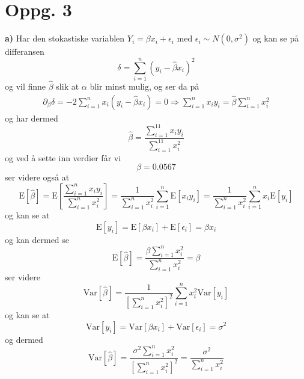\documentclass{report}
\newcommand{\bbrack}[1]{\left[ #1 \right]}
\newcommand{\Var}[1]{\text{Var} \bbrack{ #1 }}
\newcommand{\fvv}[1]{\text{E} \bbrack{ #1 }}
\begin{document}
\section*{Oppg. 3}
\textbf{a)}
Har den stokastiske variablen $Y_{i} = \beta x_{i} + \epsilon_{i}$ med $\epsilon_{i} \sim N(0, \sigma^{2})$ og kan se på differansen
\begin{equation}
  \label{eq:25}
  \delta = \sum_{i=1}^{n} (y_{i} - \widehat{\beta} x_{i})^{2}
\end{equation}
og vil finne $\widehat{\beta}$ slik at $\alpha$ blir minst mulig, og ser da på
\begin{equation}
  \label{eq:23}
  \begin{split}
    \partial_{\beta} \delta = -2 \sum_{i=1}^{n} x_{i}(y_{i} - \widehat{\beta}x_{i}) = 0 \Rightarrow \sum_{i=1}^{n} x_{i} y_{i} = \widehat{\beta} \sum_{i=1}^{n} x_{i}^{2}
  \end{split}
\end{equation}
og har dermed
\begin{equation}
  \label{eq:26}
  \widehat{\beta} = \frac{\sum_{i=1}^{11} x_{i}y_{i}}{\sum_{i=1}^{11}x_{i}^{2}}
\end{equation}
og ved å sette inn verdier får vi
\begin{equation}
  \label{eq:27}
  \beta = 0.0567
\end{equation}
ser videre også at
\begin{equation}
  \label{eq:28}
  \fvv{ \widehat{\beta} } = \fvv{ \frac{\sum_{i=1}^{n}x_{i}y_{i}}{\sum_{i=1}^{n}x_{i}^{2}} }
  = \frac{1}{\sum_{i=1}^{n}x_{i}^{2}} \sum_{i=1}^{n} \fvv{ x_{i} y_{i} }
  =  \frac{1}{\sum_{i=1}^{n}x_{i}^{2}} \sum_{i=1}^{n} x_{i} \fvv{y_{i}}
\end{equation}
og kan se at
\begin{equation}
  \label{eq:30}
  \fvv{ y_{i} } = \fvv{ \beta x_{i} } + \fvv{ \epsilon_{i} } = \beta x_{i}
\end{equation}
og kan dermed se
\begin{equation}
  \label{eq:31}
  \fvv{\widehat{\beta}} = \frac{\beta \sum_{i=1}^{n} x_{i}^{2}}{\sum_{i=1}^{n} x_{i}^{2}} = \beta
\end{equation}
ser videre
\begin{equation}
  \label{eq:32}
  \Var{\widehat{\beta}} = \frac{1}{\bbrack{\sum_{i=1}^{n} x_{i}^{2}}^{2}} \sum_{i=1}^{n} x_{i}^{2} \Var{y_{i}}
\end{equation}
og kan se at
\begin{equation}
  \label{eq:33}
  \Var{y_{i}} = \Var{\beta x_{i}} + \Var{\epsilon_{i}} = \sigma^{2}
\end{equation}
og dermed
\begin{equation}
  \label{eq:34}
  \Var{\widehat{\beta}} = \frac{\sigma^{2} \sum_{i=1}^{n} x_{i}^{2}}{\bbrack{\sum_{i=1}^{n} x_{i}^{2}}^{2}} = \frac{\sigma^{2}}{\sum_{i=1}^{n}x_{i}^{2}}
\end{equation}
\end{document}
